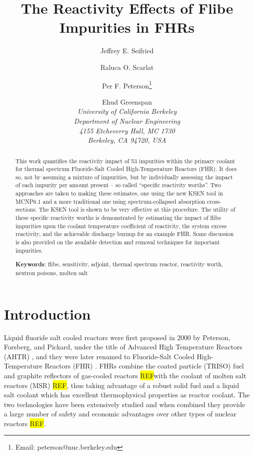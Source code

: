 \documentclass[11pt]{article}
\newcommand{\Keywords}[1]{\vspace{12pt}\par\noindent
{\small{\bf Keywords\/}: #1}}
\newcommand{\REF}[0]{\colorbox{yellow}{REF}}
\begin{document}
\title{The Reactivity Effects of Flibe Impurities in FHRs}
\author{Jeffrey E. Seifried \and Raluca O. Scarlat \and Per F. Peterson\footnote{Email: peterson@nuc.berkeley.edu} \and Ehud Greenspan \\
\em University of California Berkeley\\
\em Department of Nuclear Engineering\\
\em 4155 Etcheverry Hall, MC 1730\\
\em Berkeley, CA 94720, USA
}
\date{}
\maketitle

\begin{abstract}
    This work quantifies the reactivity impact of 53 impurities within the primary coolant for thermal spectrum Fluoride-Salt Cooled High-Temperature Reactors (FHR).
    It does so, not by assuming a mixture of impurities, but by individually assessing the impact of each impurity per amount present -- so called ``specific reactivity worths''.
    Two approaches are taken to making these estimates, one using the new KSEN tool in MCNP6.1 and a more traditional one using spectrum-collapsed absorption cross-sections.
    The KSEN tool is shown to be very effective at this procedure.
    The utility of these specific reactivity worths is demonstrated by estimating the impact of flibe impurities upon the coolant temperature coefficient of reactivity, the system excess reactivity, and the achievable discharge burnup for an example FHR.
    Some discussion is also provided on the available detection and removal techniques for important impurities.

    \Keywords{flibe, sensitivity, adjoint, thermal spectrum reactor, reactivity worth, neutron poisons, molten salt}
\end{abstract}

\pagebreak

\section{Introduction}
\label{sec:intro}

Liquid fluoride salt cooled reactors were first proposed in 2000 by Peterson, Forsberg, and Pickard, under the title of Advanced High Temperature Reactors (AHTR) \cite{forsberg2003msc}, and they were later renamed to Fluoride-Salt Cooled High-Temperature Reactors (FHR) \cite{scarlat2013csf}.
FHRs combine the coated particle (TRISO) fuel and graphite reflectors of gas-cooled reactors \REF with the coolant of molten salt reactors (MSR) \REF, thus taking advantage of a robust solid fuel and a liquid salt coolant which has excellent thermophysical properties as reactor coolant.
The two technologies have been extensively studied and when combined they provide a large number of safety and economic advantages over other types of nuclear reactors \REF.
\end{document}
